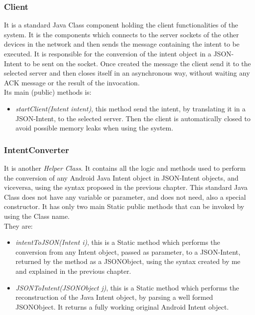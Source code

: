 \subsubsection{Client}
It is a standard Java Class component holding the client functionalities of the system. It is the components which connects to the  server sockets of the other devices in the network and then sends the message containing the intent to be executed. It is responsible for the conversion of the intent object in a JSON-Intent to be sent on the socket. Once created the message the client send it to the selected server and then closes itself in an asynchronous way, without waiting any ACK message or the result of the invocation.\\
Its main (public) methods is:
\begin{itemize}
	\item \textit{startClient(Intent intent)}, this method send the intent, by translating it in a JSON-Intent, to the selected server. Then the client is automatically closed to avoid possible memory leaks when using the system. 
\end{itemize}
\subsubsection{IntentConverter}
It is another \textit{Helper Class}. It contains all the logic and methods used to perform the conversion of any Android Java Intent object in JSON-Intent objects, and viceversa, using the syntax proposed in the previous chapter. This standard Java Class does not have any variable or parameter, and does not need, also a special constructor. It has only two main Static public methods that can be invoked by using the Class name. \\They are:
\begin{itemize}
	\item \textit{intentToJSON(Intent i)}, this is a Static method which performs the conversion from any Intent object, passed as parameter, to a JSON-Intent, returned by the method as a JSONObject, using the syntax created by me and explained in the previous chapter.
	\item \textit{JSONToIntent(JSONObject j)}, this is a Static method which performs the reconstruction of the Java Intent object, by parsing a well formed JSONObject. It returns a fully working original Android Intent object.
\end{itemize}
